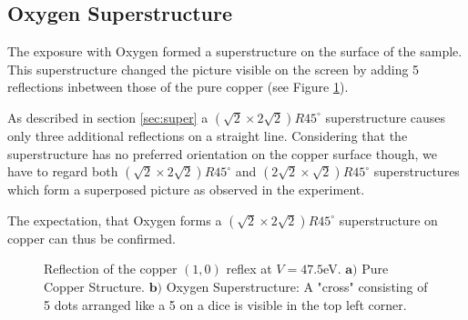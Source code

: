 \documentclass[a4paper]{scrartcl}
\numberwithin{equation}{section}
\numberwithin{figure}{section}
\numberwithin{table}{section}
\newcommand{\ve}[1]{\mathbf{ #1} }
\begin{document}
\subsection{Oxygen Superstructure}
The exposure with Oxygen formed a superstructure on the surface of the sample. This superstructure changed the picture visible on the screen by adding 5 reflections inbetween those of the pure copper (see Figure \ref{fig:super}).

As described in section \ref{sec:super} a $(\sqrt{2} \times 2\sqrt{2})R45^\circ$ superstructure causes only three additional reflections on a straight line. Considering that the superstructure has no preferred orientation on the copper surface though, we have to regard both $(\sqrt{2} \times 2\sqrt{2})R45^\circ$ and $(2\sqrt{2} \times \sqrt{2})R45^\circ$ superstructures which form a superposed picture as observed in the experiment. 

The expectation, that Oxygen forms a $(\sqrt{2} \times 2\sqrt{2})R45^\circ$ superstructure on copper can thus be confirmed.
\begin{figure} 
 \centering
{}
\hfill
{}
	\caption{\small Reflection of the copper $(1,0)$ reflex at $V=47.5$eV. $\ve a)$ Pure Copper Structure. $\ve b)$ Oxygen Superstructure: A "cross" consisting of 5 dots arranged like a 5 on a dice is visible in the top left corner.}
	\label{fig:super}
\end{figure}
\end{document}

